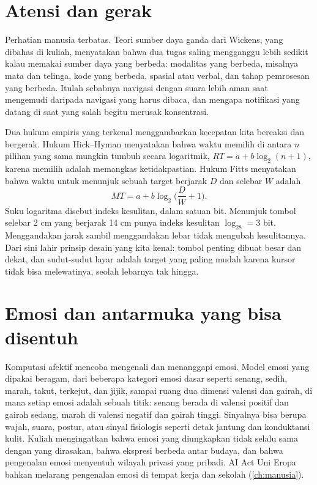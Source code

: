 \section{Atensi dan gerak}

Perhatian manusia terbatas. Teori sumber daya ganda dari Wickens, yang dibahas di kuliah, menyatakan bahwa dua tugas
saling mengganggu lebih sedikit kalau memakai sumber daya yang berbeda: modalitas yang berbeda, misalnya mata dan
telinga, kode yang berbeda, spasial atau verbal, dan tahap pemrosesan yang berbeda. Itulah sebabnya navigasi dengan
suara lebih aman saat mengemudi daripada navigasi yang harus dibaca, dan mengapa notifikasi yang datang di saat yang
salah begitu merusak konsentrasi.

Dua hukum empiris yang terkenal menggambarkan kecepatan kita bereaksi dan bergerak. Hukum Hick--Hyman menyatakan bahwa
waktu memilih di antara $n$ pilihan yang sama mungkin tumbuh secara logaritmik, $RT=a+b\log_2(n+1)$, karena memilih
adalah memangkas ketidakpastian. Hukum Fitts menyatakan bahwa waktu untuk menunjuk sebuah target berjarak $D$ dan
selebar $W$ adalah
\begin{equation}
MT=a+b\log_2\Big(\frac DW+1\Big).
\end{equation}
Suku logaritma disebut indeks kesulitan, dalam satuan bit. Menunjuk tombol selebar 2 cm yang berjarak 14 cm punya
indeks kesulitan $\log_28=3$ bit. Menggandakan jarak sambil menggandakan lebar tidak mengubah kesulitannya. Dari sini
lahir prinsip desain yang kita kenal: tombol penting dibuat besar dan dekat, dan sudut-sudut layar adalah target yang
paling mudah karena kursor tidak bisa melewatinya, seolah lebarnya tak hingga.

\section{Emosi dan antarmuka yang bisa disentuh}

Komputasi afektif mencoba mengenali dan menanggapi emosi. Model emosi yang dipakai beragam, dari beberapa kategori
emosi dasar seperti senang, sedih, marah, takut, terkejut, dan jijik, sampai ruang dua dimensi valensi dan gairah, di
mana setiap emosi adalah sebuah titik: senang berada di valensi positif dan gairah sedang, marah di valensi negatif dan
gairah tinggi. Sinyalnya bisa berupa wajah, suara, postur, atau sinyal fisiologis seperti detak jantung dan konduktansi
kulit. Kuliah mengingatkan bahwa emosi yang diungkapkan tidak selalu sama dengan yang dirasakan, bahwa ekspresi berbeda
antar budaya, dan bahwa pengenalan emosi menyentuh wilayah privasi yang pribadi. AI Act Uni Eropa bahkan melarang
pengenalan emosi di tempat kerja dan sekolah (\cref{ch:manusia}).

